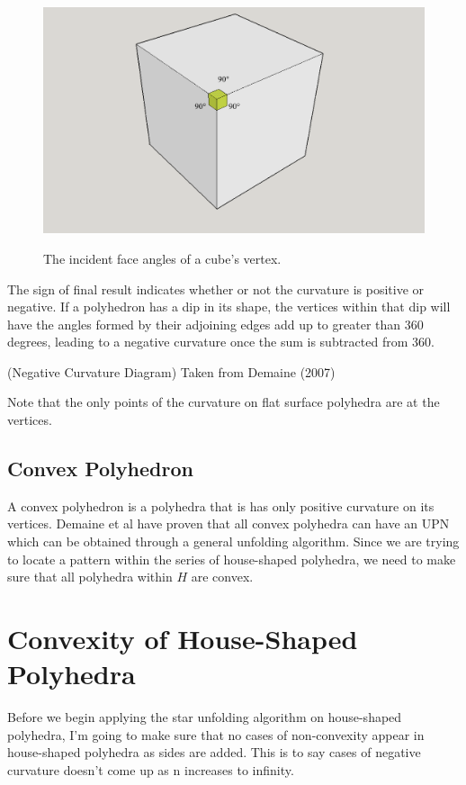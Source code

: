 \documentclass[12 pt]{article}
\begin{document}
\begin{figure}[h]
\caption{The incident face angles of a cube's vertex.}
\centering
\includegraphics[scale=0.35]{cubeCurvature.png}
\label{cubeAngles}
\end{figure}

	The sign of final result indicates whether or not the curvature is positive or negative. If a polyhedron has a dip in its shape, the vertices within that dip will have the angles formed by their adjoining edges add up to greater than 360 degrees, leading to a negative curvature once the sum is subtracted from 360. 
	
(Negative Curvature Diagram)
Taken from Demaine (2007)

	Note that the only points of the curvature on flat surface polyhedra are at the vertices.

\subsection*{Convex Polyhedron}
	A convex polyhedron is a polyhedra that is has only positive curvature on its vertices. Demaine et al have proven that all convex polyhedra can have an UPN which can be obtained through a general unfolding algorithm. Since we are trying to locate a pattern within the series of house-shaped polyhedra, we need to make sure that all polyhedra within $H$ are convex.

\section{Convexity of House-Shaped Polyhedra}
	Before we begin applying the star unfolding algorithm on house-shaped polyhedra, I'm going to make sure that no cases of non-convexity appear in house-shaped polyhedra as sides are added. This is to say cases of negative curvature doesn't come up as n increases to infinity.
	
\end{document}
